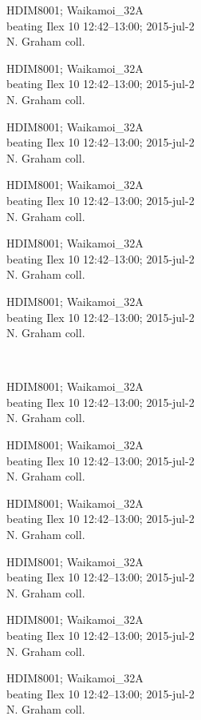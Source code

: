 \documentclass[2pt]{extarticle}
\begin{document}
\noindent
\parbox{0.16\textwidth}{\tiny \raggedright \rule[-0.3\baselineskip]{0pt}{10pt}HDIM8001; Waikamoi\_32A\\ beating Ilex 10 12:42--13:00; 2015-jul-2\\ N. Graham coll.}
\parbox{0.16\textwidth}{\tiny \raggedright \rule[-0.3\baselineskip]{0pt}{10pt}HDIM8001; Waikamoi\_32A\\ beating Ilex 10 12:42--13:00; 2015-jul-2\\ N. Graham coll.}
\parbox{0.16\textwidth}{\tiny \raggedright \rule[-0.3\baselineskip]{0pt}{10pt}HDIM8001; Waikamoi\_32A\\ beating Ilex 10 12:42--13:00; 2015-jul-2\\ N. Graham coll.}
\parbox{0.16\textwidth}{\tiny \raggedright \rule[-0.3\baselineskip]{0pt}{10pt}HDIM8001; Waikamoi\_32A\\ beating Ilex 10 12:42--13:00; 2015-jul-2\\ N. Graham coll.}
\parbox{0.16\textwidth}{\tiny \raggedright \rule[-0.3\baselineskip]{0pt}{10pt}HDIM8001; Waikamoi\_32A\\ beating Ilex 10 12:42--13:00; 2015-jul-2\\ N. Graham coll.}
\parbox{0.16\textwidth}{\tiny \raggedright \rule[-0.3\baselineskip]{0pt}{10pt}HDIM8001; Waikamoi\_32A\\ beating Ilex 10 12:42--13:00; 2015-jul-2\\ N. Graham coll.} \\ 
\vspace{0.001in} 

\noindent
\parbox{0.16\textwidth}{\tiny \raggedright \rule[-0.3\baselineskip]{0pt}{10pt}HDIM8001; Waikamoi\_32A\\ beating Ilex 10 12:42--13:00; 2015-jul-2\\ N. Graham coll.}
\parbox{0.16\textwidth}{\tiny \raggedright \rule[-0.3\baselineskip]{0pt}{10pt}HDIM8001; Waikamoi\_32A\\ beating Ilex 10 12:42--13:00; 2015-jul-2\\ N. Graham coll.}
\parbox{0.16\textwidth}{\tiny \raggedright \rule[-0.3\baselineskip]{0pt}{10pt}HDIM8001; Waikamoi\_32A\\ beating Ilex 10 12:42--13:00; 2015-jul-2\\ N. Graham coll.}
\parbox{0.16\textwidth}{\tiny \raggedright \rule[-0.3\baselineskip]{0pt}{10pt}HDIM8001; Waikamoi\_32A\\ beating Ilex 10 12:42--13:00; 2015-jul-2\\ N. Graham coll.}
\parbox{0.16\textwidth}{\tiny \raggedright \rule[-0.3\baselineskip]{0pt}{10pt}HDIM8001; Waikamoi\_32A\\ beating Ilex 10 12:42--13:00; 2015-jul-2\\ N. Graham coll.}
\parbox{0.16\textwidth}{\tiny \raggedright \rule[-0.3\baselineskip]{0pt}{10pt}HDIM8001; Waikamoi\_32A\\ beating Ilex 10 12:42--13:00; 2015-jul-2\\ N. Graham coll.} \\ 
\vspace{0.001in} 
\end{document}
